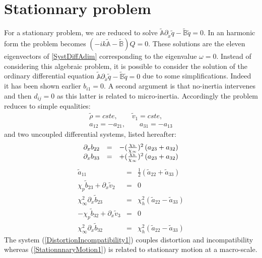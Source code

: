 \documentclass[
10pt, %
a4paper, %
oneside, %
headinclude,footinclude, %
table
]{scrartcl}
\begin{document}
\section{Stationnary problem}
For a stationary problem, we are reduced to solve $\tilde{\mathbb{A}}\partial_{\tilde{x}}\tilde{q}-\tilde{\mathbb{B}}\tilde{q}=0$. In an harmonic form the problem becomes $(-ik\tilde{\mathbb{A}}-\tilde{\mathbb{B}})Q=0$. These solutions are the eleven eigenvectors of \ref{SystDiffAdim} corresponding  to the eigenvalue $\omega=0$. Instead of considering this algebraic problem, it is possible to consider the solution of the ordinary differential equation $\tilde{\mathbb{A}}\partial_{\tilde{x}}\tilde{q}-\tilde{\mathbb{B}}\tilde{q}=0$ due to some simplifications. Indeed it has been shown earlier $b_{i1}=0$. A second argument is that no-inertia intervenes and then $d_{ij}=0$ as this latter is related to micro-inertia. Accordingly the problem reduces to simple equalities:
$$
\begin{array}{c}
\tilde{\rho}=\textit{cste}, \quad\quad	\tilde{v}_{1}=\textit{cste},
\\
a_{12}=-a_{21}, \quad\quad
a_{31}=-a_{13}
\end{array}
$$
and two uncoupled differential systems, listed hereafter:
\begin{equation}\label{DistortionIncompatibility1}
\begin{array}{rcl}
\partial_{x}b_{22}&=&-(\frac{\chi_{h}}{\chi_{\infty}})^2\left(a_{23}+a_{32}\right)\\
\partial_{x}b_{33}&=&+(\frac{\chi_{h}}{\chi_{\infty}})^2\left(a_{23}+a_{32}\right)
\end{array}
\end{equation}
\begin{equation}\label{StationnnaryMotion1}
\begin{array}{rcl}
\tilde{a}_{11}&=&\frac{1}{2}\left(\tilde{a}_{22}+\tilde{a}_{33}\right)  \\[6pt]
 \chi_p \tilde{b}_{23}+\partial_{x}\tilde{v}_2&=&0 \\
\chi _{\infty }^2\partial_{x}\tilde{b}_{23} &=&\chi _h^2 \left(\tilde{a}_{22}-\tilde{a}_{33}\right)\\[6pt]
-\chi_p \tilde{b}_{32}+\partial_{x}\tilde{v}_3&=&0 \\
\chi _{\infty }^2\partial_{x}\tilde{b}_{32}&=&\chi _h^2 \left(\tilde{a}_{22}-\tilde{a}_{33}\right)
\end{array}
\end{equation}   
The system (\ref{DistortionIncompatibility1}) couples distortion and incompatibility whereas (\ref{StationnnaryMotion1}) is related to stationary motion at a macro-scale. 
\end{document}
